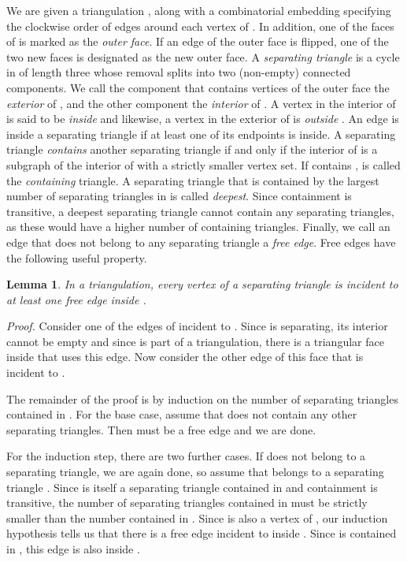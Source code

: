 \pdfoutput=1 \documentclass[12pt]{elsarticle}
\newtheorem{lem}[defin]{Lemma}
\newenvironment{lemma}{\begin{lem} \sl}{\end{lem}}
\newenvironment{proof}{\emph{Proof.}}{\hfill  \medskip\\}
\begin{document}
We are given a triangulation , along with a combinatorial embedding specifying the clockwise order of edges around each vertex of . In addition, one of the faces of  is marked as the \emph{outer face}. If an edge of the outer face is flipped, one of the two new faces is designated as the new outer face. A \emph{separating triangle}  is a cycle in  of length three whose removal splits  into two (non-empty) connected components. We call the component that contains vertices of the outer face the \emph{exterior} of , and the other component the \emph{interior} of . A vertex in the interior of  is said to be \emph{inside}  and likewise, a vertex in the exterior of  is \emph{outside} . An edge is inside a separating triangle if at least one of its endpoints is inside. A separating triangle  \emph{contains} another separating triangle  if and only if the interior of  is a subgraph of the interior of  with a strictly smaller vertex set. If  contains ,  is called the \emph{containing} triangle. A separating triangle that is contained by the largest number of separating triangles in  is called \emph{deepest}. Since containment is transitive, a deepest separating triangle cannot contain any separating triangles, as these would have a higher number of containing triangles. Finally, we call an edge that does not belong to any separating triangle a \emph{free edge}. Free edges have the following useful property.

\begin{lemma}
 \label{lem:freeedge}
 In a triangulation, every vertex  of a separating triangle  is incident to at least one free edge inside .
\end{lemma}
\begin{proof}
 Consider one of the edges of  incident to . Since  is separating, its interior cannot be empty and since  is part of a triangulation, there is a triangular face inside  that uses this edge. Now consider the other edge  of this face that is incident to .

 The remainder of the proof is by induction on the number of separating triangles contained in . For the base case, assume that  does not contain any other separating triangles. Then  must be a free edge and we are done.

 For the induction step, there are two further cases. If  does not belong to a separating triangle, we are again done, so assume that  belongs to a separating triangle . Since  is itself a separating triangle contained in  and containment is transitive, the number of separating triangles contained in  must be strictly smaller than the number contained in . Since  is also a vertex of , our induction hypothesis tells us that there is a free edge incident to  inside . Since  is contained in , this edge is also inside .
\end{proof}
\end{document}
